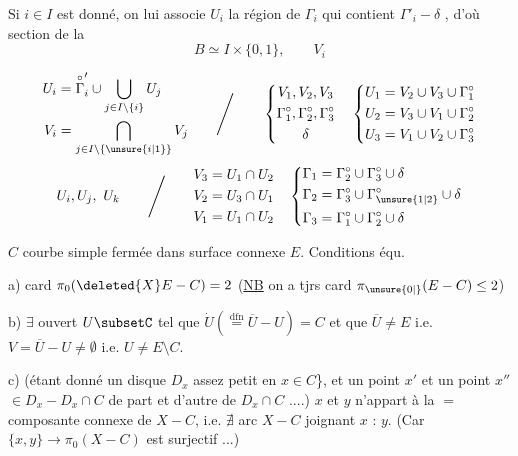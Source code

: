 Si $i\in I$ est donné, on lui associe $U_i$ la région de $\Gamma_i$ qui contient $\Gamma'_i-\delta$ , d'où section de la 
\[
 B\simeq I\times\{0,1\},\qquad V_i
\]

\[
\begin{aligned}
 U_i&=\overset{\circ}{\Gamma}'_i\cup\bigcup_{j\in I\setminus\{i\}}U_j\\
 V_i&=\bigcap_{j\in I\setminus\{\unsure{i|1}\}}V_j
\end{aligned}
\qquad\Bigg/\qquad
\left\{\begin{gathered}
 V_1,V_2,V_3\\ \Gamma_1^\circ,\Gamma_2^\circ,\Gamma_3^\circ\\ \delta
\end{gathered}\right.
\quad
\left\{\begin{aligned}
 U_1&=V_2\cup V_3\cup\Gamma_1^\circ\\
 U_2&=V_3\cup V_1\cup\Gamma_2^\circ\\
 U_3&=V_1\cup V_2\cup\Gamma_3^\circ
\end{aligned}\right.
\]
\[
 U_i,U_j,\ U_k\qquad\Bigg/\qquad
\begin{aligned}
 V_3&=U_1\cap U_2\\
 V_2&=U_3\cap U_1\\
 V_1&=U_1\cap U_2
\end{aligned}
\quad
\left\{\begin{aligned}
 \Gamma_1&=\Gamma_2^\circ\cup\Gamma_3^\circ\cup\delta\\
 \Gamma_2&=\Gamma_3^\circ\cup\Gamma_{\unsure{1|2}}^\circ\cup\delta\\
 \Gamma_3&=\Gamma_1^\circ\cup\Gamma_2^\circ\cup\delta
\end{aligned}\right.
\]

$C$ courbe simple fermée dans surface connexe $E$. Conditions équ.

a) card $\pi_0(\deleted{X}E-C)=2$ \quad (\uline{NB} on a tjrs card $\pi_{\unsure{0|{}}}(E-C)\le 2$)

b) $\exists$ ouvert $U\subsetC$ tel que $\dot U(\overset{\text{dfn}}{=}\overline U-U)=C$ et que 
$\overline U\ne E$ i.e. $V=\overline U-U\ne\emptyset$ i.e. $U\ne E\setminus C$.

c) (étant donné un disque $D_x$ assez petit  en $x\in C$\}, et un point $x'$ et un point $x''$ $\in D_x-D_x\cap C$ de part et d'autre de $D_x\cap C$ ....)
$x$ et $y$ n'appart  à la $=$ composante connexe de $X-C$, i.e. $\nexists$ arc  $X-C$ joignant $x$ : $y$.
(Car $\{x,y\}\longrightarrow\pi_0(X-C)$ est surjectif ...)

